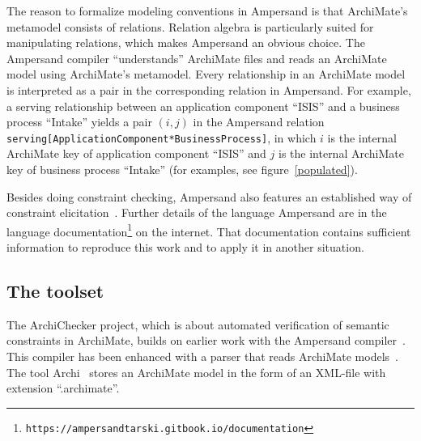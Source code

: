 \documentclass[sn-vancouver]{sn-jnl}%
\theoremstyle{thmstyleone}%
\theoremstyle{thmstyletwo}%
\theoremstyle{thmstylethree}%
\begin{document}
The reason to formalize modeling conventions in Ampersand is that ArchiMate's metamodel consists of relations.
Relation algebra is particularly suited for manipulating relations, which makes Ampersand an obvious choice.
The Ampersand compiler ``understands'' ArchiMate files and reads an ArchiMate model using ArchiMate's metamodel.
Every relationship in an ArchiMate model is interpreted as a pair in the corresponding relation in Ampersand.
For example, a serving relationship between an application component ``ISIS'' and a business process ``Intake'' yields a pair
$(i,j)$ in the Ampersand relation {\small\tt serving[ApplicationComponent*BusinessProcess]},
in which $i$ is the internal ArchiMate key of application component ``ISIS'' and
$j$ is the internal ArchiMate key of business process ``Intake'' (for examples, see figure~\ref{populated}).

Besides doing constraint checking, Ampersand also features an established way of constraint elicitation~\cite{wedemeijer2014relation}.
Further details of the language Ampersand are in the language documentation\footnote{\tt\tiny https://ampersandtarski.gitbook.io/documentation} on the internet.
That documentation contains sufficient information to reproduce this work and to apply it in another situation.

\subsection{The toolset}\label{technical}
The ArchiChecker project, which is about automated verification of semantic constraints in ArchiMate,
builds on earlier work with the Ampersand compiler~\cite{joosten2018relation}.
This compiler has been enhanced with a parser that reads ArchiMate models~\cite{filetenterprise}.
The tool Archi~\cite{Archi} stores an ArchiMate model in the form of an XML-file with extension ``.archimate''.
\end{document}
